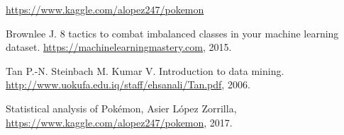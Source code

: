 \documentclass[fleqn,10pt]{SelfArx} %
\begin{document}

\vspace*{6cm} %
\begin{thebibliography}{9}
\url{https://www.kaggle.com/alopez247/pokemon}

 Brownlee J. 8 tactics to combat imbalanced classes
in your machine learning dataset. \url{https://machinelearningmastery.com}, 2015.

Tan P.-N. Steinbach M. Kumar V. Introduction to data
mining. \url{http://www.uokufa.edu.iq/staff/ehsanali/Tan.pdf},  2006.

Statistical analysis of Pokémon, Asier López Zorrilla, \url{https://www.kaggle.com/alopez247/pokemon}, 2017.
\end{thebibliography}
 
\end{document}
